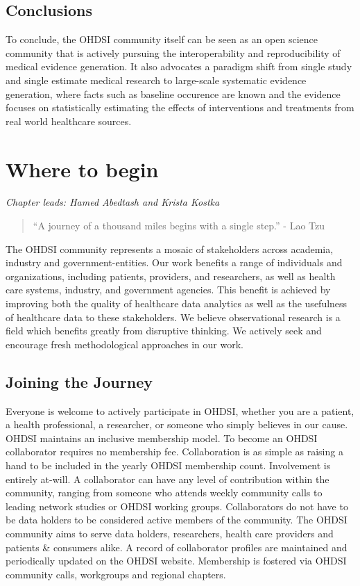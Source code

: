 \documentclass[11pt]{book}
\theoremstyle{definition}
\theoremstyle{definition}
\theoremstyle{definition}
\theoremstyle{remark}
\begin{document}
\hypertarget{conclusions}{%
\section{Conclusions}\label{conclusions}}

To conclude, the OHDSI community itself can be seen as an open science community that is actively pursuing the interoperability and reproducibility of medical evidence generation. It also advocates a paradigm shift from single study and single estimate medical research to large-scale systematic evidence generation, where facts such as baseline occurence are known and the evidence focuses on statistically estimating the effects of interventions and treatments from real world healthcare sources.

\hypertarget{WhereToBegin}{%
\chapter{Where to begin}\label{WhereToBegin}}

\emph{Chapter leads: Hamed Abedtash and Krista Kostka}

\begin{quote}
``A journey of a thousand miles begins with a single step.'' - Lao Tzu
\end{quote}

The OHDSI community represents a mosaic of stakeholders across academia, industry and government-entities. Our work benefits a range of individuals and organizations, including patients, providers, and researchers, as well as health care systems, industry, and government agencies. This benefit is achieved by improving both the quality of healthcare data analytics as well as the usefulness of healthcare data to these stakeholders. We believe observational research is a field which benefits greatly from disruptive thinking. We actively seek and encourage fresh methodological approaches in our work.

\hypertarget{joining-the-journey}{%
\section{Joining the Journey}\label{joining-the-journey}}

Everyone is welcome to actively participate in OHDSI, whether you are a patient, a health professional, a researcher, or someone who simply believes in our cause. OHDSI maintains an inclusive membership model. To become an OHDSI collaborator requires no membership fee. Collaboration is as simple as raising a hand to be included in the yearly OHDSI membership count. Involvement is entirely at-will. A collaborator can have any level of contribution within the community, ranging from someone who attends weekly community calls to leading network studies or OHDSI working groups. Collaborators do not have to be data holders to be considered active members of the community. The OHDSI community aims to serve data holders, researchers, health care providers and patients \& consumers alike. A record of collaborator profiles are maintained and periodically updated on the OHDSI website. Membership is fostered via OHDSI community calls, workgroups and regional chapters.
\end{document}
